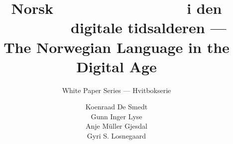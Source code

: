 %                                                                             
%
%
% 

\usepackage{polyglossia}
\newcommand{\bokmaal}[1]{#1} %
\newcommand{\nynorsk}[1]{} %


\title{Norsk \ \ \ \ \ \ \ \ \ \ \ \ \ \ \ \  i den \ \ \ \ \ \ \ \  digitale tidsalderen --- The Norwegian Language in the Digital Age}



\subtitle{\bokmaal{White Paper Series --- Hvitbokserie}\nynorsk{White Paper Series --- Kvitbokserie}}

\author{
  Koenraad De Smedt\\
  Gunn Inger Lyse\\
  Anje Müller Gjesdal\\
  Gyri S. Losnegaard
}


